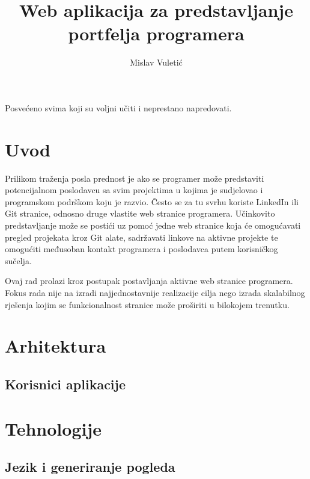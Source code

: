 \documentclass[times, utf8, zavrsni, numeric]{fer}
\begin{document}

\title{Web aplikacija za predstavljanje portfelja programera}

\author{Mislav Vuletić}

\maketitle

\zahvala{}
Posvećeno svima koji su voljni učiti i neprestano napredovati.

\tableofcontents

\chapter{Uvod}
\qquad Prilikom traženja posla prednost je ako se programer može predstaviti potencijalnom poslodavcu sa svim projektima u kojima je sudjelovao i programskom podrškom koju je razvio.
Često se za tu svrhu koriste LinkedIn\footnotemark{} ili Git\footnotemark{} stranice, odnosno druge vlastite web stranice programera.
Učinkovito predstavljanje može se postići uz pomoć jedne web stranice koja će omogućavati pregled projekata kroz Git alate, sadržavati linkove na aktivne projekte te omogućiti međusoban kontakt programera i poslodavca putem korisničkog sučelja.

Ovaj rad prolazi kroz postupak postavljanja aktivne web stranice programera.
Fokus rada nije na izradi najjednostavnije realizacije cilja nego izrada skalabilnog rješenja kojim se funkcionalnost stranice može proširiti u bilokojem trenutku.

\chapter{Arhitektura}
\section{Korisnici aplikacije}

\chapter{Tehnologije}
\section{Jezik i generiranje pogleda}
\end{document}

